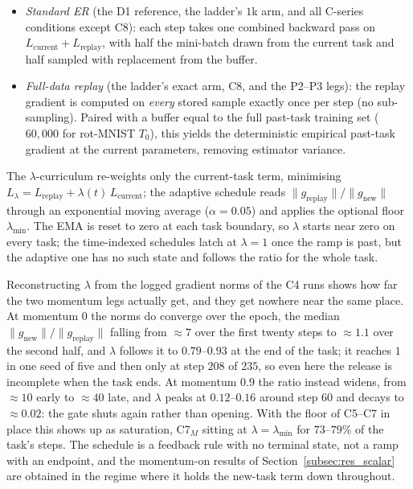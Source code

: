 \begin{itemize}
    \item \emph{Standard ER} (the D1 reference, the ladder's $1$k arm, and all C-series conditions except C8): each step takes one combined backward pass on $L_{\text{current}} + L_{\text{replay}}$, with half the mini-batch drawn from the current task and half sampled with replacement from the buffer.
    \item \emph{Full-data replay} (the ladder's exact arm, C8, and the P2--P3 legs): the replay gradient is computed on \emph{every} stored sample exactly once per step (no sub-sampling). Paired with a buffer equal to the full past-task training set ($60{,}000$ for rot-MNIST $T_0$), this yields the deterministic empirical past-task gradient at the current parameters, removing estimator variance.
\end{itemize}

The $\lambda$-curriculum re-weights only the current-task term, minimising $L_\lambda = L_{\text{replay}} + \lambda(t)\, L_{\text{current}}$; the adaptive schedule reads $\|g_{\text{replay}}\|/\|g_{\text{new}}\|$ through an exponential moving average ($\alpha = 0.05$) and applies the optional floor $\lambda_{\min}$. The EMA is reset to zero at each task boundary, so $\lambda$ starts near zero on every task; the time-indexed schedules latch at $\lambda = 1$ once the ramp is past, but the adaptive one has no such state and follows the ratio for the whole task.

Reconstructing $\lambda$ from the logged gradient norms of the C4 runs shows how far the two momentum legs actually get, and they get nowhere near the same place. At momentum $0$ the norms do converge over the epoch, the median $\|g_{\text{new}}\|/\|g_{\text{replay}}\|$ falling from ${\approx}7$ over the first twenty steps to ${\approx}1.1$ over the second half, and $\lambda$ follows it to $0.79$--$0.93$ at the end of the task; it reaches $1$ in one seed of five and then only at step $208$ of $235$, so even here the release is incomplete when the task ends. At momentum $0.9$ the ratio instead widens, from ${\approx}10$ early to ${\approx}40$ late, and $\lambda$ peaks at $0.12$--$0.16$ around step $60$ and decays to ${\approx}0.02$: the gate shuts again rather than opening. With the floor of C5--C7 in place this shows up as saturation, C7$_M$ sitting at $\lambda = \lambda_{\min}$ for $73$--$79\%$ of the task's steps. The schedule is a feedback rule with no terminal state, not a ramp with an endpoint, and the momentum-on results of Section~\ref{subsec:res_scalar} are obtained in the regime where it holds the new-task term down throughout.

